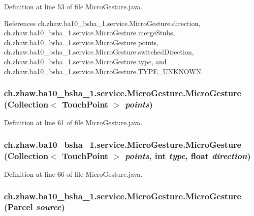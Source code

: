 Definition at line 53 of file MicroGesture.java.

References ch.zhaw.ba10\_\-bsha\_\-1.service.MicroGesture.direction, ch.zhaw.ba10\_\-bsha\_\-1.service.MicroGesture.mergeStubs, ch.zhaw.ba10\_\-bsha\_\-1.service.MicroGesture.points, ch.zhaw.ba10\_\-bsha\_\-1.service.MicroGesture.switchedDirection, ch.zhaw.ba10\_\-bsha\_\-1.service.MicroGesture.type, and ch.zhaw.ba10\_\-bsha\_\-1.service.MicroGesture.TYPE\_\-UNKNOWN.\hypertarget{classch_1_1zhaw_1_1ba10__bsha__1_1_1service_1_1MicroGesture_aef999428ccd948a1f401fff6b3787735}{
\subsubsection[{MicroGesture}]{\setlength{\rightskip}{0pt plus 5cm}ch.zhaw.ba10\_\-bsha\_\-1.service.MicroGesture.MicroGesture (Collection$<$ {\bf TouchPoint} $>$ {\em points})}}
\label{classch_1_1zhaw_1_1ba10__bsha__1_1_1service_1_1MicroGesture_aef999428ccd948a1f401fff6b3787735}


Definition at line 61 of file MicroGesture.java.\hypertarget{classch_1_1zhaw_1_1ba10__bsha__1_1_1service_1_1MicroGesture_afc2e5298086d59136576c9f232f68b2c}{
\subsubsection[{MicroGesture}]{\setlength{\rightskip}{0pt plus 5cm}ch.zhaw.ba10\_\-bsha\_\-1.service.MicroGesture.MicroGesture (Collection$<$ {\bf TouchPoint} $>$ {\em points}, \/  int {\em type}, \/  float {\em direction})}}
\label{classch_1_1zhaw_1_1ba10__bsha__1_1_1service_1_1MicroGesture_afc2e5298086d59136576c9f232f68b2c}


Definition at line 66 of file MicroGesture.java.\hypertarget{classch_1_1zhaw_1_1ba10__bsha__1_1_1service_1_1MicroGesture_a915edd1a693527b48678802234a9d37d}{
\subsubsection[{MicroGesture}]{\setlength{\rightskip}{0pt plus 5cm}ch.zhaw.ba10\_\-bsha\_\-1.service.MicroGesture.MicroGesture (Parcel {\em source})}}
\label{classch_1_1zhaw_1_1ba10__bsha__1_1_1service_1_1MicroGesture_a915edd1a693527b48678802234a9d37d}


